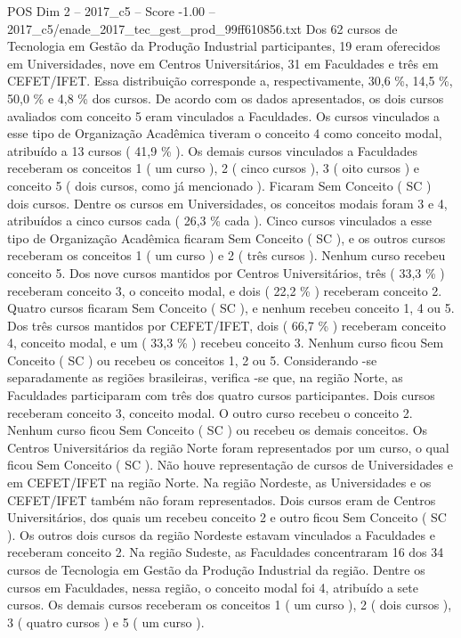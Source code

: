 \begin{textsample}{POS Dim 2 – 2017\_c5 – Score -1.00 – 2017\_c5/enade\_2017\_tec\_gest\_prod\_99ff610856.txt}
Dos 62 cursos de Tecnologia em Gestão da Produção Industrial participantes, 19 eram oferecidos em Universidades, nove em Centros Universitários, 31 em Faculdades e três em CEFET/IFET.
Essa distribuição corresponde a, respectivamente, 30,6 \%, 14,5 \%, 50,0 \% e 4,8 \% dos cursos.
De acordo com os dados apresentados, os dois cursos avaliados com conceito 5 eram vinculados a Faculdades.
Os cursos vinculados a esse tipo de Organização Acadêmica tiveram o conceito 4 como conceito modal, atribuído a 13 cursos ( 41,9 \% ).
Os demais cursos vinculados a Faculdades receberam os conceitos 1 ( um curso ), 2 ( cinco cursos ), 3 ( oito cursos ) e conceito 5 ( dois cursos, como já mencionado ).
Ficaram Sem Conceito ( SC ) dois cursos.
Dentre os cursos em Universidades, os conceitos modais foram 3 e 4, atribuídos a cinco cursos cada ( 26,3 \% cada ).
Cinco cursos vinculados a esse tipo de Organização Acadêmica ficaram Sem Conceito ( SC ), e os outros cursos receberam os conceitos 1 ( um curso ) e 2 ( três cursos ).
Nenhum curso recebeu conceito 5.
Dos nove cursos mantidos por Centros Universitários, três ( 33,3 \% ) receberam conceito 3, o conceito modal, e dois ( 22,2 \% ) receberam conceito 2.
Quatro cursos ficaram Sem Conceito ( SC ), e nenhum recebeu conceito 1, 4 ou 5.
Dos três cursos mantidos por CEFET/IFET, dois ( 66,7 \% ) receberam conceito 4, conceito modal, e um ( 33,3 \% ) recebeu conceito 3.
Nenhum curso ficou Sem Conceito ( SC ) ou recebeu os conceitos 1, 2 ou 5.
Considerando -se separadamente as regiões brasileiras, verifica -se que, na região Norte, as Faculdades participaram com três dos quatro cursos participantes.
Dois cursos receberam conceito 3, conceito modal.
O outro curso recebeu o conceito 2.
Nenhum curso ficou Sem Conceito ( SC ) ou recebeu os demais conceitos.
Os Centros Universitários da região Norte foram representados por um curso, o qual ficou Sem Conceito ( SC ).
Não houve representação de cursos de Universidades e em CEFET/IFET na região Norte.
Na região Nordeste, as Universidades e os CEFET/IFET também não foram representados.
Dois cursos eram de Centros Universitários, dos quais um recebeu conceito 2 e outro ficou Sem Conceito ( SC ).
Os outros dois cursos da região Nordeste estavam vinculados a Faculdades e receberam conceito 2.
Na região Sudeste, as Faculdades concentraram 16 dos 34 cursos de Tecnologia em Gestão da Produção Industrial da região.
Dentre os cursos em Faculdades, nessa região, o conceito modal foi 4, atribuído a sete cursos.
Os demais cursos receberam os conceitos 1 ( um curso ), 2 ( dois cursos ), 3 ( quatro cursos ) e 5 ( um curso ).

\end{textsample}
